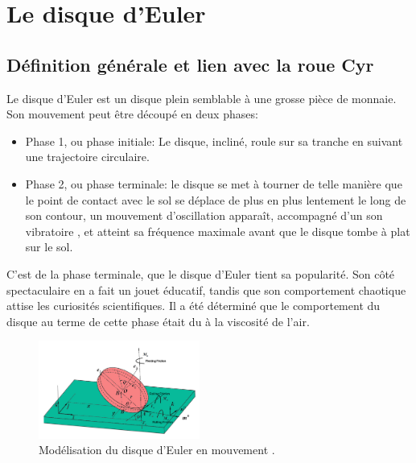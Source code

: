 \label{sec:RevLitt}

\section{Le disque d'Euler}
\subsection{Définition générale et lien avec la roue Cyr}
Le disque d'Euler est un disque plein semblable à une grosse pièce de monnaie. Son mouvement peut être découpé en deux phases:
\begin{itemize}
\item Phase 1, ou phase initiale: Le disque, incliné, roule sur sa tranche en suivant une trajectoire circulaire.
\item Phase 2, ou phase terminale: le disque se met à tourner de telle manière que le point de contact avec le sol se déplace de plus en plus lentement le long de son contour, un mouvement d'oscillation apparaît, accompagné d'un son vibratoire \cite{ringing}, et atteint sa fréquence maximale avant que le disque tombe à plat sur le sol.
\end{itemize}

C'est de la phase terminale, que le disque d'Euler tient sa popularité. Son côté spectaculaire en a fait un jouet éducatif, tandis que son comportement chaotique attise les curiosités scientifiques. Il a été déterminé que le comportement du disque au terme de cette phase était du à la viscosité de l'air.\\

\begin{figure}[h]
\centering
\includegraphics[width=200]{images_autres/diskma.png}
\caption{Modélisation du disque d'Euler en mouvement \cite{ma_dynamics_2016}.}
\label{fig:figures}
\end{figure}

